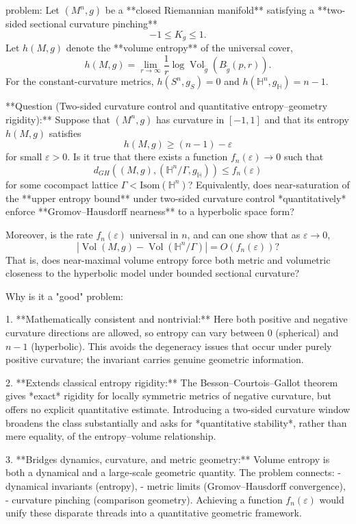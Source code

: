 problem:  
Let \( (M^n,g) \) be a **closed Riemannian manifold** satisfying a **two-sided sectional curvature pinching**
\[
-1 \le K_g \le 1.
\]
Let \( h(M,g) \) denote the **volume entropy** of the universal cover,  
\[
h(M,g) = \lim_{r\to \infty} \frac{1}{r}\log \operatorname{Vol}_{\widetilde g}(B_{\widetilde g}(p,r)).
\]
For the constant-curvature metrics, \(h(S^n,g_S)=0\) and \(h(\mathbb{H}^n,g_{\mathbb{H}}) = n-1\).

**Question (Two-sided curvature control and quantitative entropy–geometry rigidity):**  
Suppose that \( (M^n,g) \) has curvature in \([-1,1]\) and that its entropy \(h(M,g)\) satisfies
\[
h(M,g) \ge (n-1) - \varepsilon
\]
for small \(\varepsilon>0\).  
Is it true that there exists a function \(f_n(\varepsilon)\to0\) such that
\[
d_{GH}((M,g),(\mathbb{H}^n/\Gamma, g_{\mathbb{H}})) \le f_n(\varepsilon)
\]
for some cocompact lattice \(\Gamma<\mathrm{Isom}(\mathbb{H}^n)\)?  
Equivalently, does near-saturation of the **upper entropy bound** under two-sided curvature control *quantitatively* enforce **Gromov–Hausdorff nearness** to a hyperbolic space form?

Moreover, is the rate \(f_n(\varepsilon)\) universal in \(n\), and can one show that as \( \varepsilon\to0 \),
\[
| \operatorname{Vol}(M,g) - \operatorname{Vol}(\mathbb{H}^n/\Gamma) | = O( f_n(\varepsilon) ) ?
\]
That is, does near-maximal volume entropy force both metric and volumetric closeness to the hyperbolic model under bounded sectional curvature?

Why is it a "good" problem:  

1. **Mathematically consistent and nontrivial:**  
   Here both positive and negative curvature directions are allowed, so entropy can vary between \(0\) (spherical) and \(n-1\) (hyperbolic). This avoids the degeneracy issues that occur under purely positive curvature; the invariant carries genuine geometric information.

2. **Extends classical entropy rigidity:**  
   The Besson–Courtois–Gallot theorem gives *exact* rigidity for locally symmetric metrics of negative curvature, but offers no explicit quantitative estimate. Introducing a two‑sided curvature window broadens the class substantially and asks for *quantitative stability*, rather than mere equality, of the entropy–volume relationship.

3. **Bridges dynamics, curvature, and metric geometry:**  
   Volume entropy is both a dynamical and a large‑scale geometric quantity. The problem connects:
   - dynamical invariants (entropy),
   - metric limits (Gromov–Hausdorff convergence),
   - curvature pinching (comparison geometry).  
   Achieving a function \(f_n(\varepsilon)\) would unify these disparate threads into a quantitative geometric framework.

